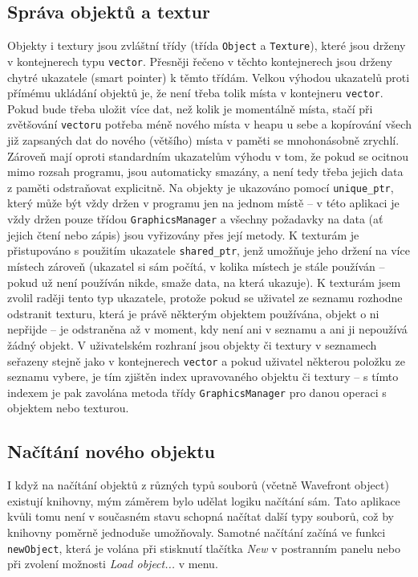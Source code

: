 \documentclass[a4paper, 11pt]{report}
\begin{document}
\subsection{Správa objektů a textur}
Objekty i textury jsou zvláštní třídy (třída \texttt{Object} a \texttt{Texture}), které jsou drženy v kontejnerech typu \texttt{vector}. Přesněji řečeno v těchto kontejnerech jsou drženy chytré ukazatele (smart pointer) k těmto třídám. Velkou výhodou ukazatelů proti přímému ukládání objektů je, že není třeba tolik místa v kontejneru \texttt{vector}. Pokud bude třeba uložit více dat, než kolik je momentálně místa, stačí při zvětšování \texttt{vectoru} potřeba méně nového místa v heapu u sebe a kopírování všech již zapsaných dat do nového (většího) místa v paměti se mnohonásobně zrychlí. Zároveň mají oproti standardním ukazatelům výhodu v tom, že pokud se ocitnou mimo rozsah programu, jsou automaticky smazány, a není tedy třeba jejich data z paměti odstraňovat explicitně. Na objekty je ukazováno pomocí \texttt{unique\_ptr}, který může být vždy držen v programu jen na jednom místě -- v této aplikaci je vždy držen pouze třídou \texttt{GraphicsManager} a všechny požadavky na data (ať jejich čtení nebo zápis) jsou vyřizovány přes její metody. K texturám je přistupováno s použitím ukazatele \texttt{shared\_ptr}, jenž umožňuje jeho držení na více místech zároveň (ukazatel si sám počítá, v kolika místech je stále používán -- pokud už není používán nikde, smaže data, na která ukazuje). K texturám jsem zvolil raději tento typ ukazatele, protože pokud se uživatel ze seznamu rozhodne odstranit texturu, která je právě některým objektem používána, objekt o ni nepřijde -- je odstraněna až v moment, kdy není ani v seznamu a ani ji nepoužívá žádný objekt. V uživatelském rozhraní jsou objekty či textury v seznamech seřazeny stejně jako v kontejnerech \texttt{vector} a pokud uživatel některou položku ze seznamu vybere, je tím zjištěn index upravovaného objektu či textury -- s tímto indexem je pak zavolána metoda třídy \texttt{GraphicsManager} pro danou operaci s objektem nebo texturou.

\subsection{Načítání nového objektu}
I když na načítání objektů z různých typů souborů (včetně Wavefront object) existují knihovny, mým záměrem bylo udělat logiku načítání sám. Tato aplikace kvůli tomu není v současném stavu schopná načítat další typy souborů, což by knihovny poměrně jednoduše umožňovaly. Samotné načítání začíná ve funkci \texttt{newObject}, která je volána při stisknutí tlačítka \emph{New} v postranním panelu nebo při zvolení možnosti \emph{Load object...} v menu.
\end{document}
